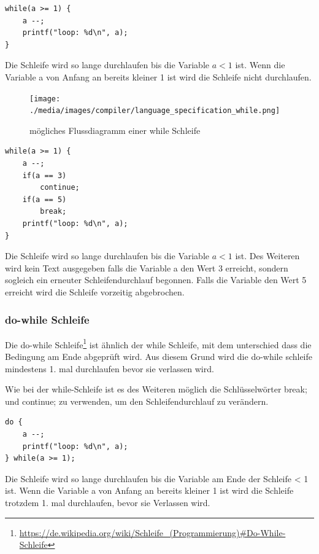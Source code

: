 
\begin{lstlisting}[language=CMM]
while(a >= 1) {
	a --;
	printf("loop: %d\n", a);
}
\end{lstlisting}

Die Schleife wird so lange durchlaufen bis die Variable $a < 1$ ist. Wenn die Variable a von Anfang an bereits kleiner 1 ist wird die Schleife nicht durchlaufen.

\begin{figure}[h]
\centering
\texttt{[image: ./media/images/compiler/language\_specification\_while.png]}
\caption{m\"ogliches Flussdiagramm einer while Schleife}
\label{language_specification_while}
\end{figure}


\begin{lstlisting}[language=CMM]
while(a >= 1) {
	a --;
	if(a == 3)
		continue;
	if(a == 5)
		break;
	printf("loop: %d\n", a);
}
\end{lstlisting}

Die Schleife wird so lange durchlaufen bis die Variable $a < 1$ ist. Des Weiteren wird kein Text ausgegeben falls die Variable a den Wert 3 erreicht, sondern sogleich ein erneuter Schleifendurchlauf begonnen. Falls die Variable den Wert 5 erreicht wird die Schleife vorzeitig abgebrochen.

\newpage
\subsubsection{do-while Schleife}

Die do-while Schleife\footnote{\url{https://de.wikipedia.org/wiki/Schleife_(Programmierung)\#Do-While-Schleife}} ist \"ahnlich der while Schleife, mit dem unterschied dass die Bedingung am Ende abgepr\"uft wird. Aus diesem Grund wird die do-while schleife mindestens 1. mal durchlaufen bevor sie verlassen wird.

Wie bei der while-Schleife ist es des Weiteren m\"oglich die Schl\"usselw\"orter break; und continue; zu verwenden, um den Schleifendurchlauf zu ver\"andern.


\begin{lstlisting}[language=CMM]
do {
	a --;
	printf("loop: %d\n", a);
} while(a >= 1);
\end{lstlisting}

Die Schleife wird so lange durchlaufen bis die Variable am Ende der Schleife < 1 ist. Wenn die Variable a von Anfang an bereits kleiner 1 ist wird die Schleife trotzdem 1. mal durchlaufen, bevor sie Verlassen wird.

